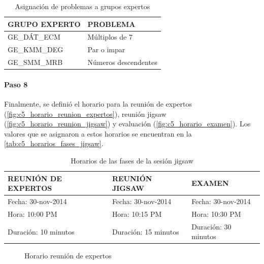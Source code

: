 \begin{longtable}{ll}
	\caption{Asignación de problemas a grupos expertos}	
	\label{tab:c5_asignacion_problemas}\\
	\toprule[0.8mm]
	GRUPO EXPERTO & PROBLEMA \\
	\midrule
	GE\_DÁT\_ECM & Múltiplos de 7\\
	GE\_KMM\_DEG & Par o impar\\
	GE\_SMM\_MRB & Números descendentes\\
	\bottomrule[0.8mm]	
\end{longtable}

\paragraph{Paso 8}
Finalmente, se definió el horario para la reunión de expertos (\autoref{fig:c5_horario_reunion_expertos}), reunión jigsaw (\autoref{fig:c5_horario_reunion_jigsaw}) y evaluación (\autoref{fig:c5_horario_examen}). Los valores que se asignaron a estos horarios se encuentran en la \autoref{tab:c5_horarios_fases_jigsaw}.

\begin{longtable}{|l|l|l|}
	\caption{Horarios de las fases de la sesión jigsaw}	
	\label{tab:c5_horarios_fases_jigsaw}\\
	\toprule[0.8mm]
	REUNIÓN DE EXPERTOS & REUNIÓN JIGSAW & EXAMEN \\
	\midrule
	Fecha: 30-nov-2014 & Fecha: 30-nov-2014 & Fecha: 30-nov-2014\\
	Hora: 10:00 PM & Hora: 10:15 PM & Hora: 10:30 PM\\
	Duración: 10 minutos & Duración: 15 minutos & Duración: 30 minutos\\
	\bottomrule[0.8mm]

\end{longtable}
 
\begin{figure}
	\centering
	\caption{Horario reunión de expertos}
	\label{fig:c5_horario_reunion_expertos}
\end{figure}

